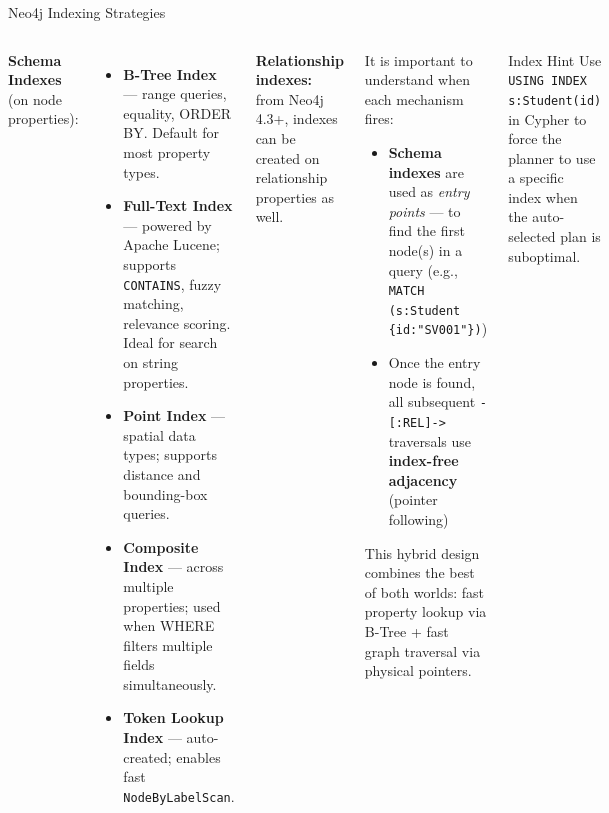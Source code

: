 \documentclass[aspectratio=169]{beamer}
\begin{document}
\begin{frame}{Neo4j Indexing Strategies}
  \begin{columns}[T]
      \small
      \textbf{Schema Indexes} (on node properties):
      \begin{itemize}\scriptsize
        \item \textbf{B-Tree Index} — range queries, equality, ORDER BY. Default for most property types.
        \item \textbf{Full-Text Index} — powered by Apache Lucene; supports \texttt{CONTAINS}, fuzzy matching, relevance scoring. Ideal for search on string properties.
        \item \textbf{Point Index} — spatial data types; supports distance and bounding-box queries.
        \item \textbf{Composite Index} — across multiple properties; used when WHERE filters multiple fields simultaneously.
        \item \textbf{Token Lookup Index} — auto-created; enables fast \texttt{NodeByLabelScan}.
      \end{itemize}
      \vspace{0.2cm}
      \textbf{Relationship indexes:} from Neo4j 4.3+, indexes can be created on relationship properties as well.
      \begin{tcolorbox}[deepdivebox, title={Deep Dive: Index vs.\ Index-Free Adjacency}]
        \scriptsize
        It is important to understand when each mechanism fires:
        \vspace{0.1cm}
        \begin{itemize}
          \item \textbf{Schema indexes} are used as \textit{entry points} — to find the first node(s) in a query (e.g., \texttt{MATCH (s:Student \{id:"SV001"\})})
          \item Once the entry node is found, all subsequent \texttt{-[:REL]->} traversals use \textbf{index-free adjacency} (pointer following)
        \end{itemize}
        \vspace{0.1cm}
        This hybrid design combines the best of both worlds: fast property lookup via B-Tree + fast graph traversal via physical pointers.
      \end{tcolorbox}
      \vspace{0.2cm}
      \begin{alertblock}{Index Hint}
        \scriptsize Use \texttt{USING INDEX s:Student(id)} in Cypher to force the planner to use a specific index when the auto-selected plan is suboptimal.
      \end{alertblock}
  \end{columns}
\end{frame}
\end{document}
